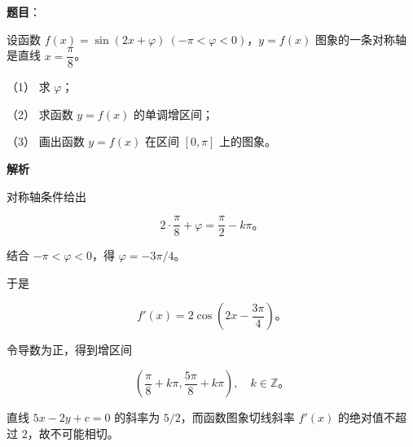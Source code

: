 \begin{answer}

\textbf{题目}：

设函数 $f(x)=\sin(2x+\varphi)\ (-\pi<\varphi<0)$，$y=f(x)$ 图象的一条对称轴是直线 $x=\dfrac{\pi}{8}$。

（1） 求 $\varphi$；

（2） 求函数 $y=f(x)$ 的单调增区间；

（3） 画出函数 $y=f(x)$ 在区间 $[0,\pi]$ 上的图象。

\textbf{解析}


对称轴条件给出

\nopagebreak[4]
\[
2\cdot\frac{\pi}{8}+\varphi=\frac\pi2-k\pi\text{。}
\]

结合 $-\pi<\varphi<0$，得 $\varphi=-3\pi/4$。


于是

\nopagebreak[4]
\[
f'(x)=2\cos\left(2x-\frac{3\pi}{4}\right)\text{。}
\]

令导数为正，得到增区间

\nopagebreak[4]
\[
\left(\frac\pi8+k\pi,\frac{5\pi}{8}+k\pi\right),\quad k\in\mathbb Z\text{。}
\]


直线 $5x-2y+c=0$ 的斜率为 $5/2$，而函数图象切线斜率 $f'(x)$ 的绝对值不超过 $2$，故不可能相切。




\end{answer}
